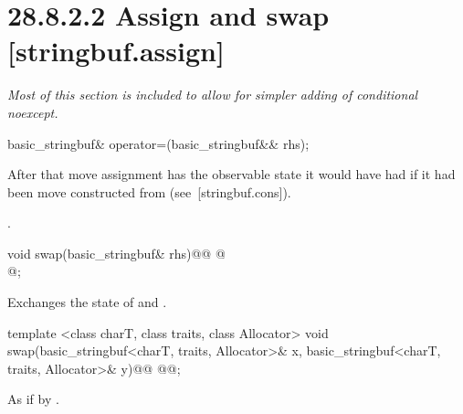 \documentclass[ebook,11pt,article]{memoir}
\renewcommand{\iref}[1]{[#1]}
\begin{document}
\section{28.8.2.2 Assign and swap [stringbuf.assign]}
\textit{Most of this section is included to allow for simpler adding of conditional noexcept.}

%
\begin{itemdecl}
basic_stringbuf& operator=(basic_stringbuf&& rhs);
\end{itemdecl}

\begin{itemdescr}
\pnum
\effects
After that move assignment  has the observable state it would
have had if it had been move constructed from  (see~\iref{stringbuf.cons}).

\pnum
\returns {}.
\end{itemdescr}

%
\begin{itemdecl}
void swap(basic_stringbuf& rhs)@\removed{;}@
@\\
       @;
\end{itemdecl}

\begin{itemdescr}
\pnum
\effects Exchanges the state of 
and . 
\end{itemdescr}

%
\begin{itemdecl}
template <class charT, class traits, class Allocator>
  void swap(basic_stringbuf<charT, traits, Allocator>& x,
            basic_stringbuf<charT, traits, Allocator>& y)@\removed{;}@
@@;
\end{itemdecl}

\begin{itemdescr}
\pnum
\effects As if by .
\end{itemdescr}
\end{document}
